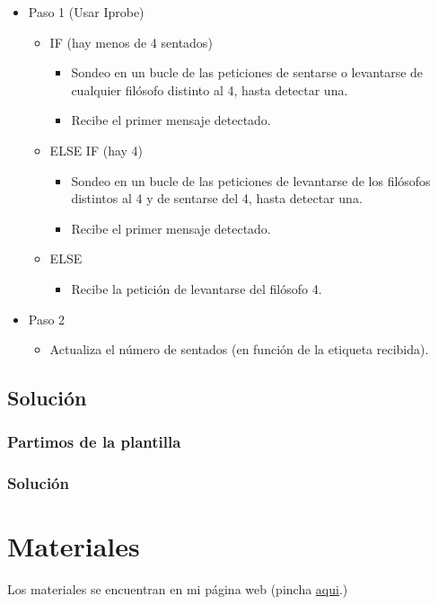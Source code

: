 \documentclass[a4paper,12pt]{article}
\begin{document}
\begin{itemize}
    \item Paso 1 (Usar Iprobe)
    \begin{itemize}
        \item IF (hay menos de 4 sentados)
        \begin{itemize}
            \item Sondeo en un bucle de las peticiones de sentarse o levantarse de cualquier filósofo distinto al 4, hasta detectar una.
            \item Recibe el primer mensaje detectado.
        \end{itemize}
        \item ELSE IF (hay 4)
        \begin{itemize}
            \item Sondeo en un bucle de las peticiones de levantarse de los filósofos distintos al 4 y de sentarse del 4, hasta detectar una.
            \item Recibe el primer mensaje detectado.
        \end{itemize}
        \item ELSE
        \begin{itemize}
            \item Recibe la petición de levantarse del filósofo 4.
        \end{itemize}
    \end{itemize}
    \item Paso 2
    \begin{itemize}
        \item Actualiza el número de sentados (en función de la etiqueta recibida).
    \end{itemize}
\end{itemize}

\subsection{Solución}
\subsubsection{Partimos de la plantilla}

\subsubsection{Solución}


\section{Materiales}
Los materiales se encuentran en mi página web (pincha \href{https://github.com/ElblogdeIsmael/ElblogdeIsmael.github.io/tree/main/Asignaturas/Tercer%20A%C3%B1o/SCD/Examenes/SegundoParcial/ETSIIT/code}{aqui}.)
\end{document}

